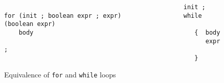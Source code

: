 




\begin {figure}

\begin{verbatim}
                                                 init ;
for (init ; boolean expr ; expr)                 while (boolean expr)
    body                                            {  body
                                                       expr ;
                                                    }

\end{verbatim}



\caption {Equivalence of \texttt{for} and \texttt{while} loops}

\label {fig:forWhileEquiv}

\end {figure}



